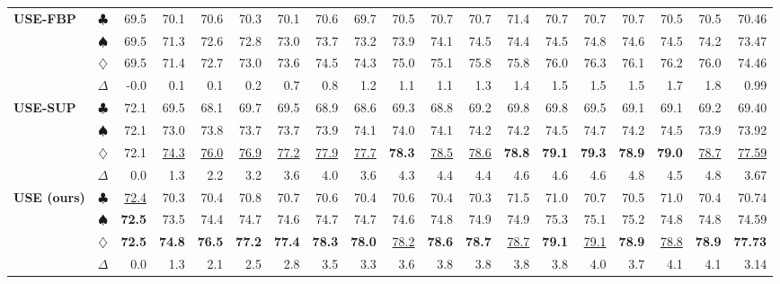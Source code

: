 \documentclass{article}
\begin{document}
\begin{table}[t]
{\begin{tabular}{lcrrrrrrrrrrrrrrrrr}
             \cmidrule(lr){1-19}

             \multirow{4}{*}{\textbf{USE-FBP}} & $\clubsuit$ & 69.5 & 70.1 & 70.6 & 70.3 & 70.1 & 70.6 & 69.7 & 70.5 & 70.7 & 70.7 & 71.4 & 70.7 & 70.7 & 70.7 & 70.5 & 70.5 & 70.46\\
             & $\spadesuit$ & 69.5 & 71.3 & 72.6 & 72.8 & 73.0 & 73.7 & 73.2 & 73.9 & 74.1 & 74.5 & 74.4 & 74.5 & 74.8 & 74.6 & 74.5 & 74.2 & 73.47\\
             & $\diamondsuit$ &69.5 & 71.4 & 72.7 & 73.0 & 73.6 & 74.5 & 74.3 & 75.0 & 75.1 & 75.8 & 75.8 & 76.0 & 76.3 & 76.1 & 76.2 & 76.0 & 74.46 \\
             & $\Delta$ & -0.0 & 0.1 & 0.1 & 0.2 & 0.7 & 0.8 & 1.2 & 1.1 & 1.1 & 1.3 & 1.4 & 1.5 & 1.5 & 1.5 & 1.7 & 1.8 & 0.99\\

            \cmidrule(lr){1-19}

             \multirow{4}{*}{\textbf{USE-SUP}} & $\clubsuit$ & 72.1 & 69.5 & 68.1 & 69.7 & 69.5 & 68.9 & 68.6 & 69.3 & 68.8 & 69.2 & 69.8 & 69.8 & 69.5 & 69.1 & 69.1 & 69.2 & 69.40\\
             & $\spadesuit$ & 72.1 & 73.0 & 73.8 & 73.7 & 73.7 & 73.9 & 74.1 & 74.0 & 74.1 & 74.2 & 74.2 & 74.5 & 74.7 & 74.2 & 74.5 & 73.9 & 73.92\\
             & $\diamondsuit$ & 72.1 & \underline{74.3} & \underline{76.0} & \underline{76.9} & \underline{77.2} & \underline{77.9} & \underline{77.7} & \textbf{78.3} & \underline{78.5} & \underline{78.6} & \textbf{78.8} & \textbf{79.1} & \textbf{79.3} & \textbf{78.9} & \textbf{79.0} & \underline{78.7} & \underline{77.59}\\
             & $\Delta$ & 0.0 & 1.3 & 2.2 & 3.2 & 3.6 & 4.0 & 3.6 & 4.3 & 4.4 & 4.4 & 4.6 & 4.6 & 4.6 & 4.8 & 4.5 & 4.8 & 3.67\\

            \cmidrule(lr){1-19}

             \multirow{4}{*}{\textbf{USE (ours)}} & $\clubsuit$ & \underline{72.4} & 70.3 & 70.4 & 70.8 & 70.7 & 70.6 & 70.4 & 70.6 & 70.4 & 70.3 & 71.5 & 71.0 & 70.7 & 70.5 & 71.0 & 70.4 & 70.74\\
             & $\spadesuit$ & \textbf{72.5} & 73.5 & 74.4 & 74.7 & 74.6 & 74.7 & 74.7 & 74.6 & 74.8 & 74.9 & 74.9 & 75.3 & 75.1 & 75.2 & 74.8 & 74.8 & 74.59\\
             & $\diamondsuit$ &\textbf{72.5} & \textbf{74.8} & \textbf{76.5} & \textbf{77.2} & \textbf{77.4} & \textbf{78.3} & \textbf{78.0} & \underline{78.2} & \textbf{78.6} & \textbf{78.7} & \underline{78.7} & \textbf{79.1} & \underline{79.1} & \textbf{78.9} & \underline{78.8} & \textbf{78.9} & \textbf{77.73}\\
             & $\Delta$ & 0.0 & 1.3 & 2.1 & 2.5 & 2.8 & 3.5 & 3.3 & 3.6 & 3.8 & 3.8 & 3.8 & 3.8 & 4.0 & 3.7 & 4.1 & 4.1 & 3.14\\

            
		\bottomrule
	\end{tabular}}
 \label{tb:next_period_prediction}
\end{table}
\end{document}
